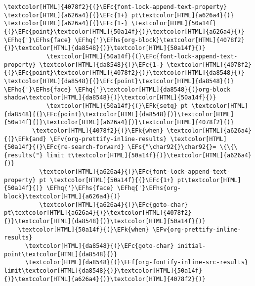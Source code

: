 \documentclass{scrartcl}
\newcommand{\EFk}[1]{\textcolor{EFk}{#1}} %
\newcommand{\EFs}[1]{\textcolor{EFs}{#1}} %
\newcommand{\EFc}[1]{\textcolor{EFc}{#1}} %
\newcommand{\EFv}[1]{\textcolor{EFv}{#1}} %
\newcommand{\EFf}[1]{\textcolor{EFf}{#1}} %
\newcommand{\EFhq}[1]{\textcolor{EFhq}{#1}} %
\newcommand{\EFhs}[1]{\textcolor{EFhs}{#1}} %
\begin{document}
\begin{enumerate}
\begin{Code}
\begin{Verbatim}[]
                \textcolor[HTML]{4078f2}{(}\EFc{font-lock-append-text-property} \textcolor[HTML]{a626a4}{(}\EFc{1+} pt\textcolor[HTML]{a626a4}{)} \textcolor[HTML]{a626a4}{(}\EFc{1-} \textcolor[HTML]{50a14f}{(}\EFc{point}\textcolor[HTML]{50a14f}{)}\textcolor[HTML]{a626a4}{)} \EFhq{'}\EFhs{face} \EFhq{'}\EFhs{org-block}\textcolor[HTML]{4078f2}{)}\textcolor[HTML]{da8548}{)}\textcolor[HTML]{50a14f}{)}
            \textcolor[HTML]{50a14f}{(}\EFc{font-lock-append-text-property} \textcolor[HTML]{da8548}{(}\EFc{1-} \textcolor[HTML]{4078f2}{(}\EFc{point}\textcolor[HTML]{4078f2}{)}\textcolor[HTML]{da8548}{)} \textcolor[HTML]{da8548}{(}\EFc{point}\textcolor[HTML]{da8548}{)} \EFhq{'}\EFhs{face} \EFhq{'}\textcolor[HTML]{da8548}{(}org-block shadow\textcolor[HTML]{da8548}{)}\textcolor[HTML]{50a14f}{)}
            \textcolor[HTML]{50a14f}{(}\EFk{setq} pt \textcolor[HTML]{da8548}{(}\EFc{point}\textcolor[HTML]{da8548}{)}\textcolor[HTML]{50a14f}{)}\textcolor[HTML]{a626a4}{)}\textcolor[HTML]{4078f2}{)}
        \textcolor[HTML]{4078f2}{(}\EFk{when} \textcolor[HTML]{a626a4}{(}\EFk{and} \EFv{org-prettify-inline-results} \textcolor[HTML]{50a14f}{(}\EFc{re-search-forward} \EFs{"\char92{}\char92{}= \{\{\{results("} limit t\textcolor[HTML]{50a14f}{)}\textcolor[HTML]{a626a4}{)}
          \textcolor[HTML]{a626a4}{(}\EFc{font-lock-append-text-property} pt \textcolor[HTML]{50a14f}{(}\EFc{1+} pt\textcolor[HTML]{50a14f}{)} \EFhq{'}\EFhs{face} \EFhq{'}\EFhs{org-block}\textcolor[HTML]{a626a4}{)}
          \textcolor[HTML]{a626a4}{(}\EFc{goto-char} pt\textcolor[HTML]{a626a4}{)}\textcolor[HTML]{4078f2}{)}\textcolor[HTML]{da8548}{)}\textcolor[HTML]{50a14f}{)}
    \textcolor[HTML]{50a14f}{(}\EFk{when} \EFv{org-prettify-inline-results}
      \textcolor[HTML]{da8548}{(}\EFc{goto-char} initial-point\textcolor[HTML]{da8548}{)}
      \textcolor[HTML]{da8548}{(}\EFf{org-fontify-inline-src-results} limit\textcolor[HTML]{da8548}{)}\textcolor[HTML]{50a14f}{)}\textcolor[HTML]{a626a4}{)}\textcolor[HTML]{4078f2}{)}


\end{Verbatim}
\end{Code}
\end{enumerate}
\end{document}
